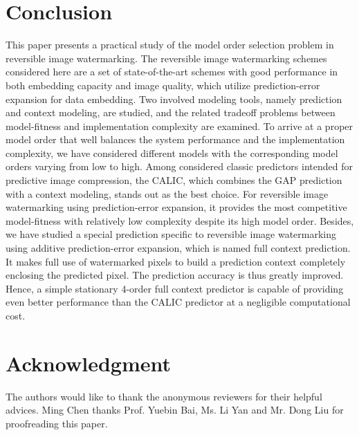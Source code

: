 \documentclass[journal]{IEEEtran}
\begin{document}
\section{Conclusion}\label{sec:conclution}

This paper presents a practical study of the model order selection problem in reversible image
watermarking. The reversible image watermarking schemes considered here are a set of
state-of-the-art schemes with good performance in both embedding capacity and image quality,
which utilize prediction-error expansion for data embedding. Two involved modeling tools, namely
prediction and context modeling, are studied, and the related tradeoff problems between
model-fitness and implementation complexity are examined. To arrive at a proper model order that
well balances the system performance and the implementation complexity, we have considered different
models with the corresponding model orders varying from low to high. Among considered classic
predictors intended for predictive image compression, the CALIC, which combines the GAP prediction
with a context modeling, stands out as the best choice. For reversible image watermarking using
prediction-error expansion, it provides the most competitive model-fitness with relatively low
complexity despite its high model order. Besides, we have studied a special prediction specific to
reversible image watermarking using additive prediction-error expansion, which is named full context
prediction. It makes full use of watermarked pixels to build a prediction context completely
enclosing the predicted pixel. The prediction accuracy is thus greatly improved. Hence, a simple
stationary 4-order full context predictor is capable of providing even better performance than the
CALIC predictor at a negligible computational cost. 

\section*{Acknowledgment}
The authors would like to thank the anonymous reviewers for their helpful advices. Ming Chen thanks
Prof. Yuebin Bai, Ms. Li Yan and Mr. Dong Liu for proofreading this paper.

\end{document}
